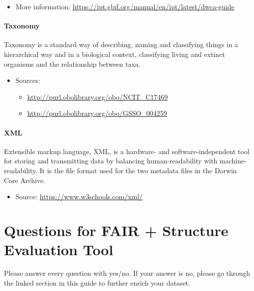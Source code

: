 \documentclass[
  oneside]{book}
\providecommand{\tightlist}{%
  \setlength{\itemsep}{0pt}\setlength{\parskip}{0pt}}
\begin{document}
\begin{itemize}
\tightlist
\item
  More information: \url{https://ipt.gbif.org/manual/en/ipt/latest/dwca-guide}
\end{itemize}

\subsubsection*{Taxonomy}\label{taxonomy}

Taxonomy is a standard way of describing, naming and classifying things in a hierarchical way and in a biological context, classifying living and extinct organisms and the relationship between taxa.

\begin{itemize}
\tightlist
\item
  Sources:

  \begin{itemize}
  \tightlist
  \item
    \url{http://purl.obolibrary.org/obo/NCIT_C17469}
  \item
    \url{http://purl.obolibrary.org/obo/GSSO_004259}
  \end{itemize}
\end{itemize}

\subsubsection*{XML}\label{XML}

Extensible markup language, XML, is a hardware- and software-independent tool for storing and transmitting data by balancing human-readability with machine-readability. It is the file format used for the two metadata files in the Darwin Core Archive.

\begin{itemize}
\tightlist
\item
  Source: \url{https://www.w3schools.com/xml/}
\end{itemize}

\chapter{Questions for FAIR + Structure Evaluation Tool}\label{questions-tool}

Please answer every question with yes/no. If your answer is no, please go through the linked section in this guide to further enrich your dataset.
\end{document}
